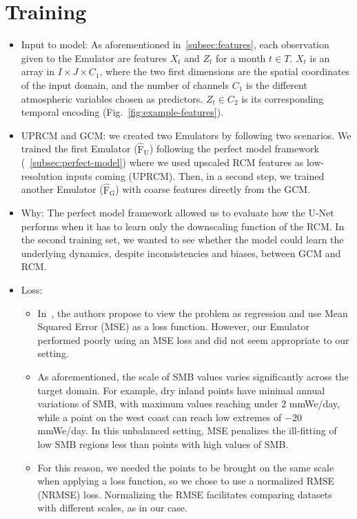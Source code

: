 \documentclass[a4paper,11pt,oneside]{report}
\begin{document}
\section{Training}\label{subsec:training}
\begin{itemize}
    \item Input to model: As aforementioned in~\ref{subsec:features}, each observation given to the Emulator are features $X_t$ and $Z_t$ for a month $t\in T$. $X_t$ is an array in $I \times J \times C_1$, where the two first dimensions are the spatial coordinates of the input domain, and the number of channels $C_1$ is the different atmospheric variables chosen as predictors. $Z_t \in C_2$ is its corresponding temporal encoding (Fig.~\ref{fig:example-features}).
    \item UPRCM and GCM: we created two Emulators by following two scenarios. We trained the first Emulator ($\operatorname{\hat{F}_U}$) following the perfect model framework (~\ref{subsec:perfect-model}) where we used upscaled RCM features as low-resolution inputs coming (UPRCM). Then, in a second step, we trained another Emulator ($\operatorname{\hat{F}_G}$) with coarse features directly from the GCM. 
    \item Why: The perfect model framework allowed us to evaluate how the U-Net performs when it has to learn only the downscaling function of the RCM. In the second training set, we wanted to see whether the model could learn the underlying dynamics, despite inconsistencies and biases, between GCM and RCM. 
    \item Loss: 
    \begin{itemize}
        \item In~\cite{Doury}, the authors propose to view the problem as regression and use Mean Squared Error (MSE) as a loss function. However, our Emulator performed poorly using an MSE loss and did not seem appropriate to our setting. 
        \item As aforementioned, the scale of SMB values varies significantly across the target domain. For example, dry inland points have minimal annual variations of SMB, with maximum values reaching under $2$ \si{mmWe/day}, while a point on the west coast can reach low extremes of $-20$ \si{mmWe/day}. In this unbalanced setting, MSE penalizes the ill-fitting of low SMB regions less than points with high values of SMB.  
        \item For this reason, we needed the points to be brought on the same scale when applying a loss function, so we chose to use a normalized RMSE (NRMSE) loss. Normalizing the RMSE facilitates comparing datasets with different scales, as in our case. 

\end{itemize}
\end{itemize}
\end{document}
